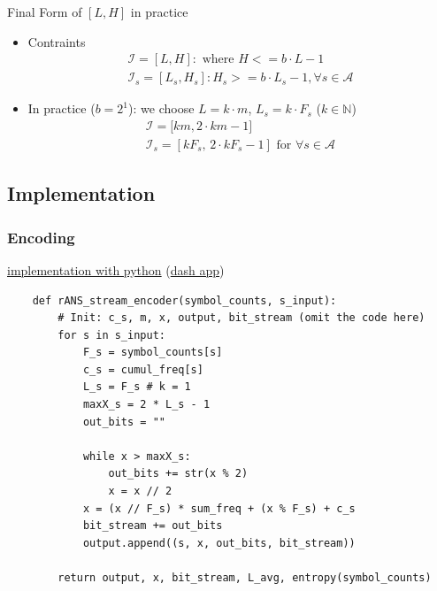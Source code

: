 \begin{frame}[fragile]{Final Form of $[L,H]$ in practice}
    \begin{itemize}
        \item Contraints $$\begin{gathered}\mathcal{I}=\mathit{[L,H]}: \text{ where } \mathit{H <= b\cdot L -1} \\ \mathcal{I}_s=\mathit{[L_s, H_s]: H_s >= b \cdot L_s - 1}, \forall \mathit{s} \in \mathcal{A}\end{gathered}$$
        \item In practice ($\mathit{b}=2^1$): we choose $\mathit{L=k\cdot m}$, $\mathit{L_s=k\cdot F_s}$ ($\mathit{k} \in \mathbb{N}$) $$\begin{gathered}\mathcal{I}=\mathit{[km}, 2\cdot \mathit{km}-1] \\ \mathcal{I}_{\mathit{s}} =[\mathit{kF_s}, \,2\cdot \mathit{kF_s} -1] \text{   for   } \forall \mathit{s} \in \mathcal{A} \end{gathered}$$
    \end{itemize}
\end{frame}

\subsection{Implementation}
\subsubsection{Encoding}
\begin{frame}[fragile]
    \href{http://localhost:8050}{implementation with python} (\href{https://github.com/hurryclear/cs_theory/tree/data_compression/24ws_data_compression/implementation}{dash app})
    \begin{verbatim}
    def rANS_stream_encoder(symbol_counts, s_input):
        # Init: c_s, m, x, output, bit_stream (omit the code here)
        for s in s_input:
            F_s = symbol_counts[s]
            c_s = cumul_freq[s]
            L_s = F_s # k = 1
            maxX_s = 2 * L_s - 1
            out_bits = ""

            while x > maxX_s:
                out_bits += str(x % 2)
                x = x // 2
            x = (x // F_s) * sum_freq + (x % F_s) + c_s
            bit_stream += out_bits
            output.append((s, x, out_bits, bit_stream))
        
        return output, x, bit_stream, L_avg, entropy(symbol_counts)
    \end{verbatim}
\end{frame}
